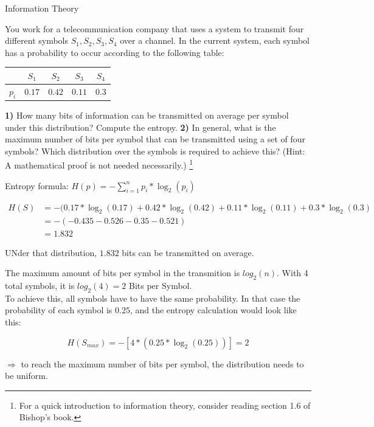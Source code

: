 \documentclass[
	english,
        solution=true
	]{tudaexercise}
\begin{document}
\begin{task}[points=5]{Information Theory}

\begin{subtask}[points=5,title=Entropy]
You work for a telecommunication company that uses a system to transmit four different symbols ${S_1, S_2, S_3, S_4}$ over a channel.
In the current system, each symbol has a probability to occur according to the following table:

\begin{center}
\begin{tabular}{r|cccc}
 & $S_1$ & $S_2$ & $S_3$ & $S_4$ \\
\hline
$p_i$ & $0.17$    & $0.42$    & $0.11$    & $0.3$
\end{tabular}
\end{center}
\textbf{1)} How many bits of information can be transmitted on average per symbol under
this distribution? Compute the entropy.
\textbf{2)} In general, what is the maximum number of bits per symbol that can be transmitted using a set of four symbols? Which
distribution over the symbols is required to achieve this? (Hint: A mathematical proof is not needed necessarily.)  \footnote{For a
    quick introduction to information theory, consider reading section 1.6 of
Bishop's book.}

\begin{solution}

    Entropy formula: $H(p)=-\sum^n_{i=1} p_i*\log_2(p_i)$

\begin{align*}
    H(S)&=-(0.17*\log_2(0.17)+0.42*\log_2(0.42)+0.11*\log_2(0.11)+0.3*\log_2(0.3)\\
    &=-(-0.435-0.526-0.35-0.521)\\
    &=1.832
\end{align*}

UNder that distribution, $1.832$ bits can be transmitted on average.
    
The maximum amount of bits per symbol in the transmition is $log_2(n)$. With 4 total symbols, it is $log_2(4)=2$ Bits per Symbol.\\

To achieve this, all symbols have to have the same probability. In that case the probability of each symbol is $0.25$, and the entropy calculation would look like this:

\[H(S_{max})=-[4*(0.25*\log_2(0.25))]=2\]

$\Rightarrow$ to reach the maximum number of bits per symbol, the distribution needs to be uniform.
\end{solution}
\end{subtask}
\end{task}
\end{document}
